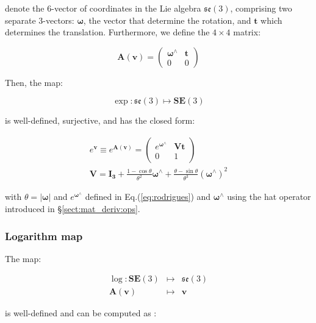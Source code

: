 \documentclass[a4paper,11pt]{report}
\newcommand{\W}{{\bm{\omega}}}
\newcommand{\hatop}[1]{#1^\wedge}
\begin{document}
\noindent denote the 6-vector of coordinates in
the Lie algebra $\mathfrak{se}(3)$,
comprising
two separate 3-vectors: $\W$, the vector that determine
the rotation, and $\mathbf{t}$ which determines the translation.
Furthermore, we define the $4 \times 4$ matrix:

\begin{equation}
 \mathbf{A}(\mathbf{v})=
\left(
\begin{array}{cc}
 \hatop{\W}  & \mathbf{t} \\
 0 & 0
\end{array}
\right)
\end{equation}


Then, the map:

\begin{equation}
  \exp: \mathfrak{se}(3) \mapsto \mathbf{SE}(3)
\end{equation}

\noindent is well-defined, surjective, and has the closed form:

\begin{eqnarray}
\label{eq:se3.exp.map}
  e^ { \mathbf{v} } \equiv  e^ { \mathbf{A}(\mathbf{v}) } =
\left(
\begin{array}{cc}
  e^{\hatop{\W}} & \mathbf{V} \mathbf{t} \\
   0 & 1
\end{array}
\right)
\\
\label{eq:V_exp}
\mathbf{V} = \mathbf{I_3}
+ \frac{1-\cos \theta}{\theta^2} \hatop{\W}
+ \frac{\theta- \sin \theta}{\theta^3} (\hatop{\W})^2 
\end{eqnarray}

\noindent with $\theta = |\W|$ and $e^{\hatop{\W}}$
defined in Eq.(\ref{eq:rodrigues})
and $\hatop{\W}$ using the hat operator introduced in \S\ref{sect:mat_deriv:ops}.


\subsubsection{Logarithm map}

The map:

\begin{eqnarray}
  \log: \mathbf{SE}(3) &\mapsto& \mathfrak{se}(3) \\
  \mathbf{A}(\mathbf{v})  & \mapsto & \mathbf{v}
\nonumber
\end{eqnarray}

\noindent is well-defined and can be computed as \cite{wang2008nps}:
\end{document}
